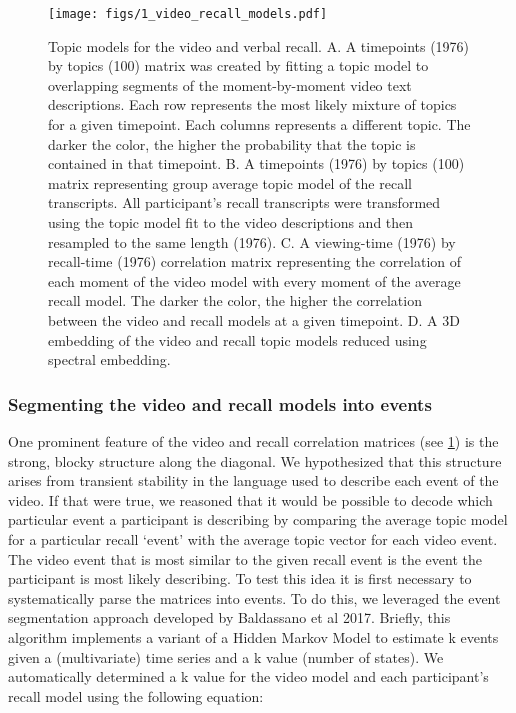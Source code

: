 \documentclass[a4paper,man,natbib,floatsintext]{apa6}
\begin{document}
\begin{figure}[t!]
\centering
\texttt{[image: figs/1\_video\_recall\_models.pdf]}
\caption{\label{fig:model}Topic models for the video and verbal recall. A. A timepoints (1976) by topics (100) matrix was created by fitting a topic model to overlapping segments of the moment-by-moment video text descriptions.  Each row represents the most likely mixture of topics for a given timepoint. Each columns represents a different topic. The darker the color, the higher the probability that the topic is contained in that timepoint. B. A timepoints (1976) by topics (100) matrix representing group average topic model of the recall transcripts.  All participant's recall transcripts were transformed using the topic model fit to the video descriptions and then resampled to the same length (1976). C. A viewing-time (1976) by recall-time (1976) correlation matrix representing the correlation of each moment of the video model with every moment of the average recall model. The darker the color, the higher the correlation between the video and recall models at a given timepoint. D. A 3D embedding of the video and recall topic models reduced using spectral embedding. }
\end{figure}

\subsubsection{Segmenting the video and recall models into events}
One prominent feature of the video and recall correlation matrices (see \ref{fig:model}) is the strong, blocky structure along the diagonal.  We hypothesized that this structure arises from transient stability in the language used to describe each event of the video. If that were true, we reasoned that it would be possible to decode which particular event a participant is describing by comparing the average topic model for a particular recall `event' with the average topic vector for each video event. The video event that is most similar to the given recall event is the event the participant is most likely describing.  To test this idea it is first necessary to systematically parse the matrices into events.  To do this, we leveraged the event segmentation approach developed by Baldassano et al 2017.  Briefly, this algorithm implements a variant of a Hidden Markov Model to estimate k events given a (multivariate) time series and a k value (number of states). We automatically determined a k value for the video model and each participant's recall model using the following equation:
\end{document}
